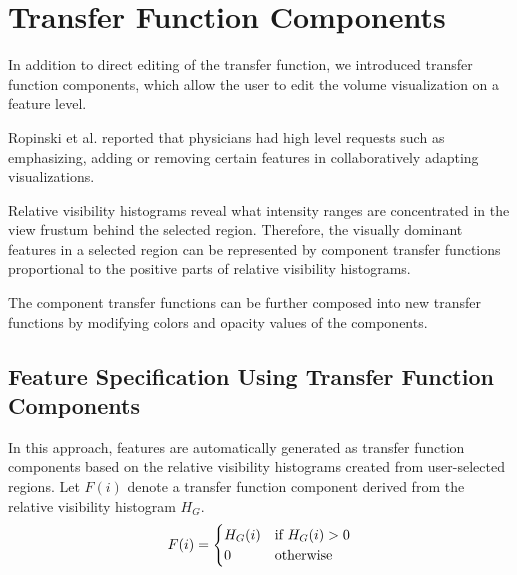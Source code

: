 \documentclass[twoside,twocolumn,10pt]{article}
\begin{document}
\section{Transfer Function Components} \label{transfer_function_components}
In addition to direct editing of the transfer function, we introduced transfer function components, which allow the user to edit the volume visualization on a feature level.

Ropinski et al. \cite{ropinski_stroke-based_2008} reported that physicians had high level requests such as emphasizing, adding or removing certain features in collaboratively adapting visualizations.

Relative visibility histograms reveal what intensity ranges are concentrated in the view frustum behind the selected region. Therefore, the visually dominant features in a selected region can be represented by component transfer functions proportional to the positive parts of relative visibility histograms.

The component transfer functions can be further composed into new transfer functions by modifying colors and opacity values of the components.




\subsection{Feature Specification Using Transfer Function Components}
In this approach, features are automatically generated as transfer function components based on the relative visibility histograms created from user-selected regions.
Let $F(i)$ denote a transfer function component derived from the relative visibility histogram $H_{G}$.
\[
F(i) =
\begin{cases}
H_{G}(i) & \text{if $ H_{G}(i)>0 $} \\
0 & \text{otherwise}
\end{cases}
\]
\end{document}
